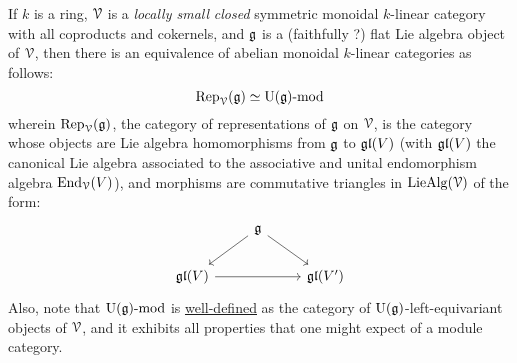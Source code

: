         \begin{theorem}
            If $k$ is a ring, $\mathcal{V}$ is a \textit{locally small} \textit{closed} symmetric monoidal $k$-linear category with all coproducts and cokernels, and $\mathfrak{g}$ is a (faithfully ?) flat Lie algebra object of $\mathcal{V}$, then there is an equivalence of abelian monoidal $k$-linear categories as follows:
                $$\mathrm{Rep}_{\mathcal{V}}(\mathfrak{g}) \simeq {\mathrm{U}(\mathfrak{g})}\text{-}\mathrm{mod}$$
            wherein $\mathrm{Rep}_{\mathcal{V}}(\mathfrak{g})$, the category of representations of $\mathfrak{g}$ on $\mathcal{V}$, is the category whose objects are Lie algebra homomorphisms from $\mathfrak{g}$ to $\mathfrak{gl}(V)$ (with $\mathfrak{gl}(V)$ the canonical Lie algebra associated to the associative and unital endomorphism algebra $\mathrm{End}_{\mathcal{V}}(V)$), and morphisms are commutative triangles in $\mathrm{Lie}\mathrm{Alg}(\mathcal{V})$ of the form:
                $$
                    \begin{tikzcd}
                    	& {\g} \\
                    	{\gl(V)} && {\gl(V')}
                    	\arrow[from=2-1, to=2-3]
                    	\arrow[from=1-2, to=2-1]
                    	\arrow[from=1-2, to=2-3]
                    \end{tikzcd}
                $$
            Also, note that ${\mathrm{U}(\mathfrak{g})}\text{-}\mathrm{mod}$ is \href{https://ncatlab.org/nlab/show/module+over+a+monoid}{\underline{well-defined}} as the category of $\mathrm{U}(\mathfrak{g})$-left-equivariant objects of $\mathcal{V}$, and it exhibits all properties that one might expect of a module category.
        \end{theorem}
